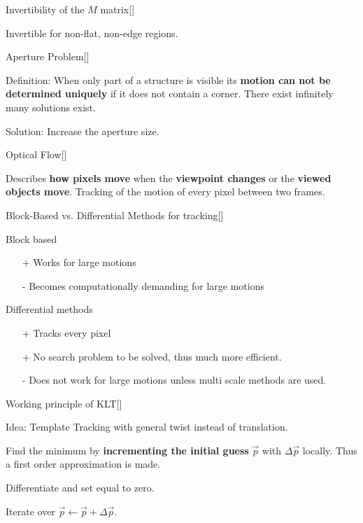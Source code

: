 \documentclass[10pt,a4paper]{scrartcl}
\begin{document}
\begin{multicols*}{2}
\begin{QandA}{Invertibility of the $M$ matrix}[\Derivation]
\item Invertible for non-flat, non-edge regions.
\end{QandA}

\begin{QandA}{Aperture Problem}[\Definition]
\item Definition: When only part of a structure is visible its \textbf{motion can not be determined uniquely} if it does not contain a corner. There exist infinitely many solutions exist.
\item Solution: Increase the aperture size.
\end{QandA}

\begin{QandA}{Optical Flow}[\Definition]
\item Describes \textbf{how pixels move} when the \textbf{viewpoint changes} or the \textbf{viewed objects move}. Tracking of the motion of every pixel between two frames.
\end{QandA}

\begin{QandA}{Block-Based vs. Differential Methods for tracking}[\Comparison]
\item Block based
\begin{itemize}
\item[+] Works for large motions
\item[-] Becomes computationally demanding for large motions
\end{itemize}
\item Differential methods
\begin{itemize}
\item[+] Tracks every pixel
\item[+] No search problem to be solved, thus much more efficient.
\item[-] Does not work for large motions unless multi scale methods are used.
\end{itemize}
\end{QandA}

\begin{QandA}{Working principle of KLT}[\Derivation]
\item Idea: Template Tracking with general twist instead of translation.
\item Find the minimum by \textbf{incrementing the initial guess} $\vec{p}$ with $\Delta \vec{p}$ locally. Thus a first order approximation is made.
\item Differentiate and set equal to zero.
\item Iterate over $\vec{p}\leftarrow \vec{p}+\Delta\vec{p}$.
\end{QandA}


\end{multicols*}
\end{document}
